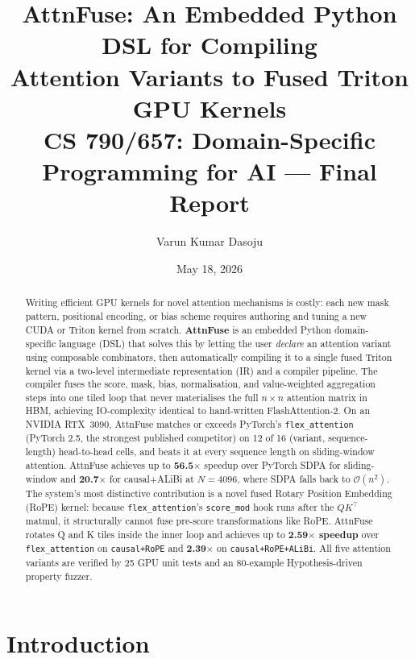 \documentclass[10pt,twocolumn]{article}
\title{%
  \textbf{AttnFuse: An Embedded Python DSL for Compiling\\
  Attention Variants to Fused Triton GPU Kernels}\\[6pt]
  \normalsize CS 790/657: Domain-Specific Programming for AI --- Final Report
}
\author{Varun Kumar Dasoju}
\date{May 18, 2026}
\begin{document}
\maketitle

\begin{abstract}
Writing efficient GPU kernels for novel attention mechanisms is costly: each
new mask pattern, positional encoding, or bias scheme requires authoring and
tuning a new CUDA or Triton kernel from scratch.
\textbf{AttnFuse} is an embedded Python domain-specific language (DSL) that
solves this by letting the user \emph{declare} an attention variant using
composable combinators, then automatically compiling it to a single fused
Triton kernel via a two-level intermediate representation (IR) and a
compiler pipeline.
The compiler fuses the score, mask, bias, normalisation, and value-weighted
aggregation steps into one tiled loop that never materialises the full
$n \times n$ attention matrix in HBM, achieving IO-complexity identical to
hand-written FlashAttention-2.
On an NVIDIA RTX~3090, AttnFuse matches or exceeds PyTorch's
\texttt{flex\_attention} (PyTorch 2.5, the strongest published competitor)
on 12 of 16 (variant, sequence-length) head-to-head cells, and beats it
at every sequence length on sliding-window attention. AttnFuse achieves
up to \textbf{56.5$\times$} speedup over PyTorch SDPA for sliding-window
and \textbf{20.7$\times$} for causal+ALiBi at $N{=}4096$, where SDPA
falls back to $\mathcal{O}(n^2)$. The system's most distinctive
contribution is a novel fused Rotary Position Embedding (RoPE) kernel:
because \texttt{flex\_attention}'s \texttt{score\_mod} hook runs after
the $Q K^\top$ matmul, it structurally cannot fuse pre-score
transformations like RoPE. AttnFuse rotates Q and K tiles inside the
inner loop and achieves up to \textbf{2.59$\times$ speedup} over
\texttt{flex\_attention} on \texttt{causal+RoPE} and \textbf{2.39$\times$}
on \texttt{causal+RoPE+ALiBi}. All five attention variants are verified
by 25 GPU unit tests and an 80-example Hypothesis-driven property fuzzer.
\end{abstract}

\section{Introduction}
\end{document}
